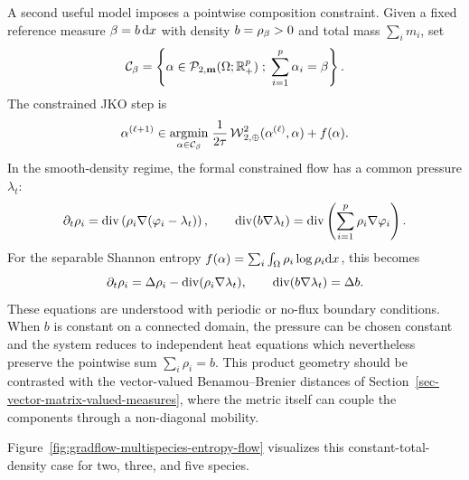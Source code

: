 A second useful model imposes a pointwise composition constraint. Given a fixed reference measure $\beta=b\,\mathrm{d} x$ with density $b=\rho_{\beta}>0$ and total mass $\sum_i m_i$, set
\begin{equation}\label{eq-multispecies-composition-constraint}
	\mathcal C_\beta=
	\left\{ \alpha\in\mathcal{P}_{2,\mathbf m}(\Omega;\mathbb{R}_+^p) \;;\; \sum_{i=1}^p \alpha_i=\beta \right\}.
\end{equation}
The constrained JKO step is
\begin{equation}\label{eq-multispecies-constrained-jko}
	\alpha^{(\ell+1)}
	\in
	\underset{\alpha\in\mathcal C_\beta}{\operatorname{argmin}}\;
		\frac{1}{2\tau}\operatorname{\mathcal{W}}_{2,\oplus}^2(\alpha^{(\ell)},\alpha)+f(\alpha).
\end{equation}
In the smooth-density regime, the formal constrained flow has a common pressure $\lambda_t$:
\begin{equation}\label{eq-multispecies-constrained-pde}
	\partial_t\rho_i=\operatorname{div}\left(\rho_i\nabla(\varphi_i-\lambda_t)\right),
	\qquad
		\operatorname{div}(b\nabla\lambda_t)=\operatorname{div}\left(\sum_{i=1}^p \rho_i\nabla\varphi_i\right).
\end{equation}
For the separable Shannon entropy $f(\alpha)=\sum_i\int_\Omega \rho_i\log\rho_i\mathrm{d} x$, this becomes
\begin{equation}\label{eq-multispecies-modified-heat}
	\partial_t\rho_i=\Delta\rho_i-\operatorname{div}(\rho_i\nabla\lambda_t),
	\qquad
	\operatorname{div}(b\nabla\lambda_t)=\Delta b.
\end{equation}
These equations are understood with periodic or no-flux boundary conditions. When $b$ is constant on a connected domain, the pressure can be chosen constant and the system reduces to independent heat equations which nevertheless preserve the pointwise sum $\sum_i\rho_i=b$. This product geometry should be contrasted with the vector-valued Benamou--Brenier distances of Section~\ref{sec-vector-matrix-valued-measures}, where the metric itself can couple the components through a non-diagonal mobility.

Figure~\ref{fig:gradflow-multispecies-entropy-flow} visualizes this constant-total-density case for two, three, and five species.


